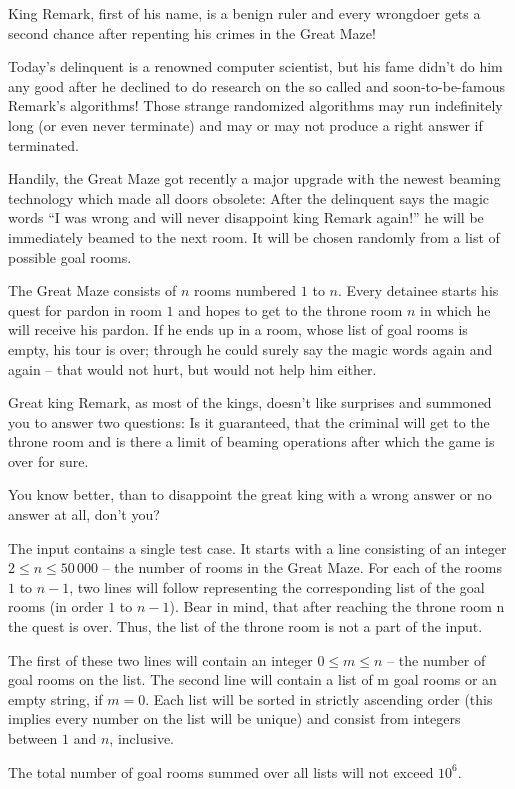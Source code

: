 King Remark, first of his name, is a benign ruler and every wrongdoer gets a second chance after repenting his crimes in the Great Maze!

Today's delinquent is a renowned computer scientist, but his fame didn't do him any good after he declined to do research on the so called and soon-to-be-famous Remark's algorithms!
Those strange randomized algorithms may run indefinitely long (or even never terminate) and may or may not produce a right answer if terminated.

Handily, the Great Maze got recently a major upgrade with the newest beaming technology which made all doors obsolete:
After the delinquent says the magic words ``I was wrong and will never
disappoint king Remark again!'' he will be immediately beamed to the next room.
It will be chosen randomly from a list of possible goal rooms.

The Great Maze consists of $n$ rooms numbered $1$ to $n$.
Every detainee starts his quest for pardon in room $1$ and hopes to get to the throne room $n$ in which he will receive his pardon.
If he ends up in a room, whose list of goal rooms is empty, his tour is over;
through he could surely say the magic words again and again -- that would not hurt, but would not help him either.

Great king Remark, as most of the kings, doesn't like surprises and summoned you to answer two questions:
Is it guaranteed, that the criminal will get to the throne room and is there a limit of beaming operations after which the game is over for sure.

You know better, than to disappoint the great king with a wrong answer or no answer at all, don't you?

\begin{Input}
    The input contains a single test case.
    It starts with a line consisting of an integer $2 \leq n \leq 50\,000$ -- the number of rooms in the Great Maze.
    For each of the rooms $1$ to $n-1$, two lines will follow representing the corresponding list of the goal rooms (in order $1$ to $n-1$).
    Bear in mind, that after reaching the throne room n the quest is over.
    Thus, the list of the throne room is not a part of the input.
    
    The first of these two lines will contain an integer $0 \leq m \leq n$ -- the number of goal rooms on the list.
    The second line will contain a list of m goal rooms or an empty string, if $m = 0$.
    Each list will be sorted in strictly ascending order (this implies every number on the list will be unique) and consist from integers between $1$ and $n$, inclusive.
    
    The total number of goal rooms summed over all lists will not exceed $10^6$.
\end{Input}

